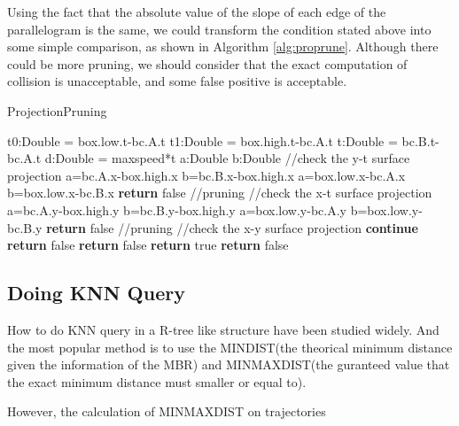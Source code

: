 \documentclass[sigplan]{acmart}
\begin{document}
Using the fact that the absolute value of the slope of each edge of the parallelogram is the same, we could transform the condition stated above into some simple comparison, as shown in Algorithm \ref{alg:proprune}. Although there could be more pruning, we should consider that the exact computation of collision is unacceptable, and some false positive is acceptable.
\begin{algorithm}
\caption{ProjectionPruning} \label{alg:proprune}
\begin{algorithmic}[1]
    \State t0:Double = box.low.t-bc.A.t
    \State t1:Double = box.high.t-bc.A.t
    \State t:Double = bc.B.t-bc.A.t
    \State d:Double = maxspeed*t
    \State a:Double
    \State b:Double
    \State //check the y-t surface projection
        \State a=bc.A.x-box.high.x
        \State b=bc.B.x-box.high.x
    \Else
        \State a=box.low.x-bc.A.x
        \State b=box.low.x-bc.B.x
    \EndIf
        \State \textbf{return} false //pruning
    \EndIf
    \State //check the x-t surface projection
        \State a=bc.A.y-box.high.y
        \State b=bc.B.y-box.high.y
    \Else
        \State a=box.low.y-bc.A.y
        \State b=box.low.y-bc.B.y
    \EndIf
        \State \textbf{return} false //pruning
    \EndIf
    \State //check the x-y surface projection
            \State \textbf{continue}
    \EndIf
            \State \textbf{return} false
        \EndIf
    \Else
            \State \textbf{return} false
        \EndIf
    \EndIf
    \State \textbf{return} true
\EndFunction
{}
        \State \textbf{return} false
    \EndIf
\EndFunction
\end{algorithmic}
\end{algorithm}

\subsection{Doing KNN Query}
How to do KNN query in a R-tree like structure have been studied widely.\cite{nnq95} And the most popular method is to use the MINDIST(the theorical minimum distance given the information of the MBR) and MINMAXDIST(the guranteed value that the exact minimum distance must smaller or equal to).\par
However, the calculation of MINMAXDIST on trajectories 
\end{document}
